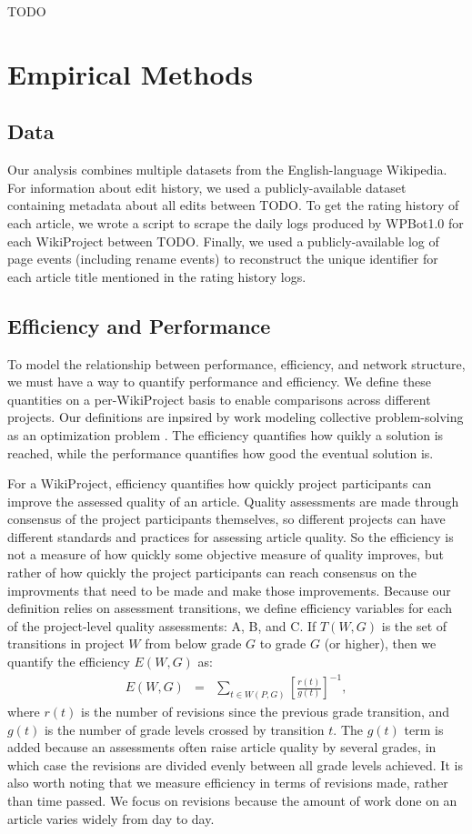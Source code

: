 \documentclass[10pt,twocolumn]{article}
\newcommand{\beq}{\begin{eqnarray}}
\newcommand{\eeq}{\end{eqnarray}}
\newcommand{\+}{\phantom{-}}
\begin{document}
TODO

\section{Empirical Methods}

\subsection{Data}

Our analysis combines multiple datasets from the English-language Wikipedia.
For information about edit history, we used a publicly-available dataset containing
metadata about all edits between TODO.
To get the rating history of each article,
we wrote a script to scrape the daily logs produced by WPBot1.0 for each WikiProject
between TODO.
Finally, we used a publicly-available log of page events (including rename events)
to reconstruct the unique identifier for each article title mentioned in the rating history logs.

\subsection{Efficiency and Performance}

To model the relationship between performance, efficiency, and network structure,
we must have a way to quantify performance and efficiency.
We define these quantities on a per-WikiProject basis to enable comparisons across different
projects.
Our definitions are inpsired by work modeling collective problem-solving as an optimization
problem \cite{}.
The efficiency quantifies how quikly a solution is reached,
while the performance quantifies how good the eventual solution is.

For a WikiProject, efficiency quantifies how quickly project participants can improve the
assessed quality of an article.
Quality assessments are made through consensus of the project participants themselves,
so different projects can have different standards and practices for assessing article quality.
So the efficiency is not a measure of how quickly some objective measure of quality improves,
but rather of how quickly the project participants can reach consensus on the improvments that
need to be made and make those improvements.
Because our definition relies on assessment transitions, we define efficiency variables for
each of the project-level quality assessments: A, B, and C.
If $T(W,G)$ is the set of transitions in project $W$ from below grade $G$ to grade $G$ (or higher),
then we quantify the efficiency $E(W,G)$ as:
\beq
E(W,G) &=& \sum_{t \in W(P,G)} \left[ \frac{r(t)}{g(t)} \right]^{-1},
\eeq
where $r(t)$ is the number of revisions since the previous grade transition,
and $g(t)$ is the number of grade levels crossed by transition $t$.
The $g(t)$ term is added because an assessments often raise article quality by several
grades, in which case the revisions are divided evenly between all grade levels achieved.
It is also worth noting that we measure efficiency in terms of revisions made,
rather than time passed.
We focus on revisions because the amount of work done on an article varies widely from day to day.
\end{document}
